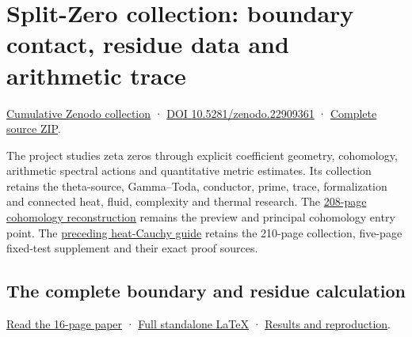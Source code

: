 \documentclass[
]{article}
\author{}
\date{}
\begin{document}
\section{Split-Zero collection: boundary contact, residue data and
arithmetic
trace}\label{split-zero-collection-boundary-contact-residue-data-and-arithmetic-trace}

\href{https://zenodo.org/records/22909361}{Cumulative Zenodo collection}
· \href{https://doi.org/10.5281/zenodo.22909361}{DOI
10.5281/zenodo.22909361} ·
\href{https://zenodo.org/records/22909361/files/168-splitzero-boundary-residue-complete-sources.zip?download=1}{Complete
source ZIP}.

The project studies zeta zeros through explicit coefficient geometry,
cohomology, arithmetic spectral actions and quantitative metric
estimates. Its collection retains the theta-source, Gamma--Toda,
conductor, prime, trace, formalization and connected heat, fluid,
complexity and thermal research. The
\href{https://zenodo.org/records/22909361/files/154-splitzero-full-support-graph-pulses.pdf?download=1}{208-page
cohomology reconstruction} remains the preview and principal cohomology
entry point. The
\href{https://github.com/KokunoYumeto/zeta-function-research-reader/blob/34b9f4cc44d52d32b96f9f3038aab9c509922359/workbenches/splitzero-tandem/continuations/20260923-heat-cauchy-publication/README.md}{preceding
heat-Cauchy guide} retains the 210-page collection, five-page fixed-test
supplement and their exact proof sources.

\subsection{The complete boundary and residue
calculation}\label{the-complete-boundary-and-residue-calculation}

\href{https://zenodo.org/records/22909361/files/167-splitzero-boundary-residue-arithmetic.pdf?download=1}{Read
the 16-page paper} ·
\href{https://github.com/KokunoYumeto/zeta-function-research-reader/blob/87e386271c488ce5914b9926c4d23d0857e0c367/workbenches/splitzero-tandem/continuations/20260923-boundary-residue-arithmetic/BOUNDARY_RESIDUE_ARITHMETIC_RECEIVERS.tex}{Full
standalone LaTeX} ·
\href{https://github.com/KokunoYumeto/zeta-function-research-reader/blob/87e386271c488ce5914b9926c4d23d0857e0c367/workbenches/splitzero-tandem/continuations/20260923-boundary-residue-arithmetic/NEW_RESULTS_2026-09-23.md}{Results
and reproduction}.
\end{document}
